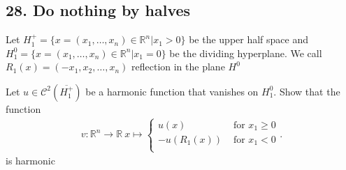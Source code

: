 \subsection*{28. Do nothing by halves}
Let $H^{+}_1  = \{x = (x_{1},\ldots ,x_n)\in  \mathbb{R}^{n} | x_{1} >0 \}   $ be the upper half space and\\
$H^{0}_1  = \{x = (x_{1},\ldots ,x_n)\in  \mathbb{R}^{n} | x_{1} =0 \}   $
be the dividing hyperplane. We call $R_1(x)  = (-x_{1},x_2,\ldots ,x_n)$ reflection in the plane $H^{0} $
\begin{exercise}[a]
  Let $u \in  \mathcal{C}^{2}(\overline{H_1^{+} } ) $ be a harmonic function that vanishes on $H_1^{0} $. Show that the function 
  \begin{align*}
    v : \mathbb{R}^{n} \to  \mathbb{R} \ x \mapsto \begin{cases}
      u(x) &\text{ for } x_{1}\ge 0\\
      -u(R_1(x)) &\text{ for } x_{1}<0\\
    \end{cases} 
  .\end{align*}
  is harmonic
\end{exercise}
